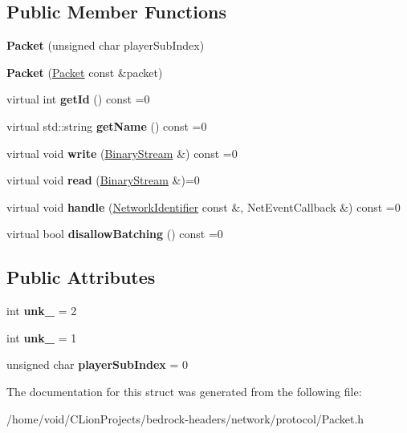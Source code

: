 \subsection*{Public Member Functions}
\begin{DoxyCompactItemize}
\item 
\mbox{\label{struct_packet_a8c995e4de5a50de3b31dcd7b7ee3fbfc}} 
{\bfseries Packet} (unsigned char player\+Sub\+Index)
\item 
\mbox{\label{struct_packet_a32b07be5461047eb99f5a22e309ea199}} 
{\bfseries Packet} (\mbox{\hyperlink{struct_packet}{Packet}} const \&packet)
\item 
\mbox{\label{struct_packet_a969163ec3c2e51ba7ac29443c231cffe}} 
virtual int {\bfseries get\+Id} () const =0
\item 
\mbox{\label{struct_packet_a3fea34a7be3439c92ad4e9c6903e698d}} 
virtual std\+::string {\bfseries get\+Name} () const =0
\item 
\mbox{\label{struct_packet_a88bd48d565dfedb480f4f74bb15fe88f}} 
virtual void {\bfseries write} (\mbox{\hyperlink{struct_binary_stream}{Binary\+Stream}} \&) const =0
\item 
\mbox{\label{struct_packet_a8dfa7c598efb7292d11744e3468deb19}} 
virtual void {\bfseries read} (\mbox{\hyperlink{struct_binary_stream}{Binary\+Stream}} \&)=0
\item 
\mbox{\label{struct_packet_aa18063550bbb7e1b22f8f04726206682}} 
virtual void {\bfseries handle} (\mbox{\hyperlink{struct_network_identifier}{Network\+Identifier}} const \&, Net\+Event\+Callback \&) const =0
\item 
\mbox{\label{struct_packet_a71ddc6e8c7f847f97de270165a19357f}} 
virtual bool {\bfseries disallow\+Batching} () const =0
\end{DoxyCompactItemize}
\subsection*{Public Attributes}
\begin{DoxyCompactItemize}
\item 
\mbox{\label{struct_packet_aeef1f1b66c04fa44914e136a22917296}} 
int {\bfseries unk\+\_} = 2
\item 
\mbox{\label{struct_packet_adb5fb0657e750fe89dab337c3a253b0c}} 
int {\bfseries unk\+\_} = 1
\item 
\mbox{\label{struct_packet_a2a7ab3c3fa701f0240f395a0ba6cae96}} 
unsigned char {\bfseries player\+Sub\+Index} = 0
\end{DoxyCompactItemize}


The documentation for this struct was generated from the following file\+:\begin{DoxyCompactItemize}
\item 
/home/void/\+C\+Lion\+Projects/bedrock-\/headers/network/protocol/Packet.\+h\end{DoxyCompactItemize}
